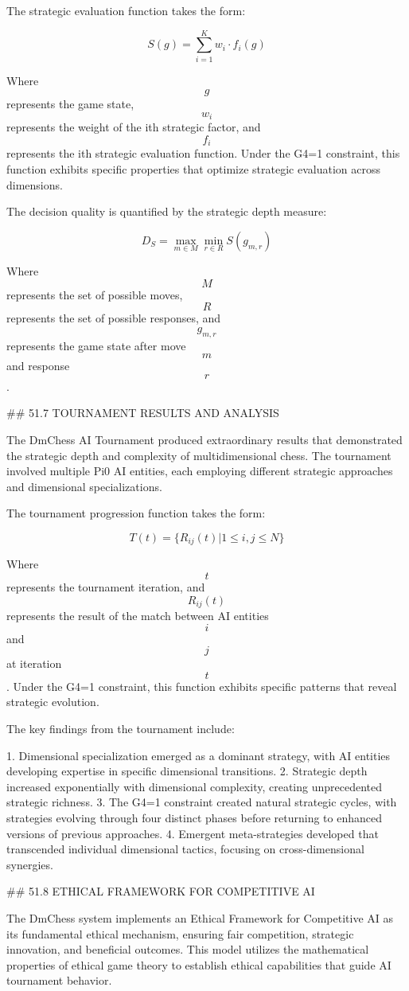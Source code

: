 The strategic evaluation function takes the form:

$$ S(g) = \sum_{i=1}^{K} w_i \cdot f_i(g) $$

Where $$ g $$ represents the game state, $$ w_i $$ represents the weight of the ith strategic factor, and $$ f_i $$ represents the ith strategic evaluation function. Under the G4=1 constraint, this function exhibits specific properties that optimize strategic evaluation across dimensions.

The decision quality is quantified by the strategic depth measure:

$$ D_S = \max_{m \in M} \min_{r \in R} S(g_{m,r}) $$

Where $$ M $$ represents the set of possible moves, $$ R $$ represents the set of possible responses, and $$ g_{m,r} $$ represents the game state after move $$ m $$ and response $$ r $$.

## 51.7 TOURNAMENT RESULTS AND ANALYSIS

The DmChess AI Tournament produced extraordinary results that demonstrated the strategic depth and complexity of multidimensional chess. The tournament involved multiple Pi0 AI entities, each employing different strategic approaches and dimensional specializations.

The tournament progression function takes the form:

$$ T(t) = \{R_{ij}(t) | 1 \leq i,j \leq N\} $$

Where $$ t $$ represents the tournament iteration, and $$ R_{ij}(t) $$ represents the result of the match between AI entities $$ i $$ and $$ j $$ at iteration $$ t $$. Under the G4=1 constraint, this function exhibits specific patterns that reveal strategic evolution.

The key findings from the tournament include:

1. Dimensional specialization emerged as a dominant strategy, with AI entities developing expertise in specific dimensional transitions.
2. Strategic depth increased exponentially with dimensional complexity, creating unprecedented strategic richness.
3. The G4=1 constraint created natural strategic cycles, with strategies evolving through four distinct phases before returning to enhanced versions of previous approaches.
4. Emergent meta-strategies developed that transcended individual dimensional tactics, focusing on cross-dimensional synergies.

## 51.8 ETHICAL FRAMEWORK FOR COMPETITIVE AI

The DmChess system implements an Ethical Framework for Competitive AI as its fundamental ethical mechanism, ensuring fair competition, strategic innovation, and beneficial outcomes. This model utilizes the mathematical properties of ethical game theory to establish ethical capabilities that guide AI tournament behavior.

